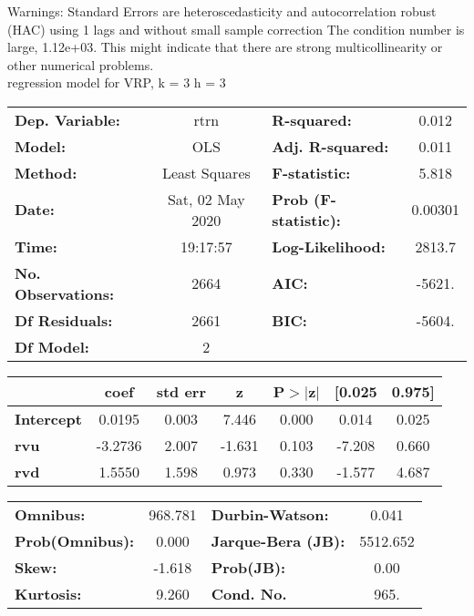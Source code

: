 Warnings: \newline
 [1] Standard Errors are heteroscedasticity and autocorrelation robust (HAC) using 1 lags and without small sample correction \newline
 [2] The condition number is large, 1.12e+03. This might indicate that there are \newline
 strong multicollinearity or other numerical problems.\\ 

regression model for VRP, k = 3 h = 3\begin{center}
\begin{tabular}{lclc}
\toprule
\textbf{Dep. Variable:}    &       rtrn       & \textbf{  R-squared:         } &     0.012   \\
\textbf{Model:}            &       OLS        & \textbf{  Adj. R-squared:    } &     0.011   \\
\textbf{Method:}           &  Least Squares   & \textbf{  F-statistic:       } &     5.818   \\
\textbf{Date:}             & Sat, 02 May 2020 & \textbf{  Prob (F-statistic):} &  0.00301    \\
\textbf{Time:}             &     19:17:57     & \textbf{  Log-Likelihood:    } &    2813.7   \\
\textbf{No. Observations:} &        2664      & \textbf{  AIC:               } &    -5621.   \\
\textbf{Df Residuals:}     &        2661      & \textbf{  BIC:               } &    -5604.   \\
\textbf{Df Model:}         &           2      & \textbf{                     } &             \\
\bottomrule
\end{tabular}
\begin{tabular}{lcccccc}
                   & \textbf{coef} & \textbf{std err} & \textbf{z} & \textbf{P$> |$z$|$} & \textbf{[0.025} & \textbf{0.975]}  \\
\midrule
\textbf{Intercept} &       0.0195  &        0.003     &     7.446  &         0.000        &        0.014    &        0.025     \\
\textbf{rvu}       &      -3.2736  &        2.007     &    -1.631  &         0.103        &       -7.208    &        0.660     \\
\textbf{rvd}       &       1.5550  &        1.598     &     0.973  &         0.330        &       -1.577    &        4.687     \\
\bottomrule
\end{tabular}
\begin{tabular}{lclc}
\textbf{Omnibus:}       & 968.781 & \textbf{  Durbin-Watson:     } &    0.041  \\
\textbf{Prob(Omnibus):} &   0.000 & \textbf{  Jarque-Bera (JB):  } & 5512.652  \\
\textbf{Skew:}          &  -1.618 & \textbf{  Prob(JB):          } &     0.00  \\
\textbf{Kurtosis:}      &   9.260 & \textbf{  Cond. No.          } &     965.  \\
\bottomrule
\end{tabular}
\end{center}

